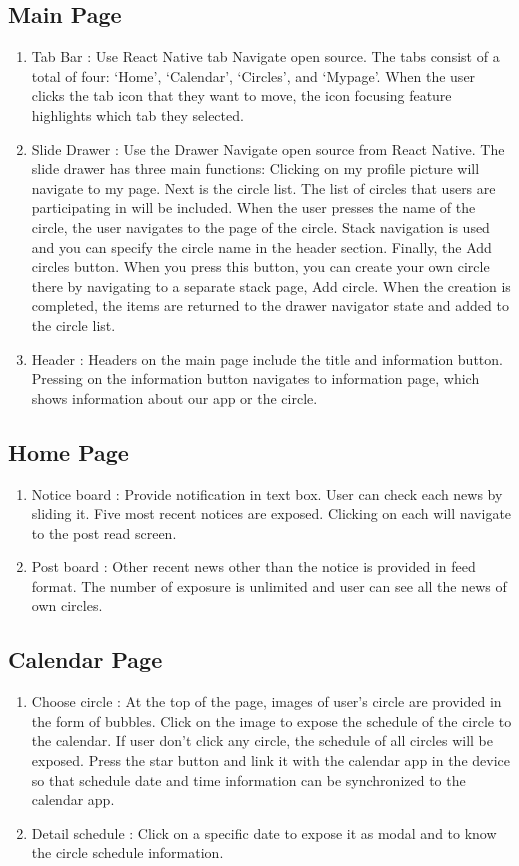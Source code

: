 \documentclass[conference]{IEEEtran}
\begin{document}
\subsection{Main Page}
\begin{enumerate}
    \item Tab Bar : Use React Native tab Navigate open source. The tabs consist of a total of four: `Home', `Calendar', `Circles', and `Mypage'. When the user clicks the tab icon that they want to move, the icon focusing feature highlights which tab they selected.
    \item Slide Drawer : Use the Drawer Navigate open source from React Native. The slide drawer has three main functions: Clicking on my profile picture will navigate to my page. Next is the circle list. The list of circles that users are participating in will be included. When the user presses the name of the circle, the user navigates to the page of the circle. Stack navigation is used and you can specify the circle name in the header section. Finally, the Add circles button. When you press this button, you can create your own circle there by navigating to a separate stack page, Add circle. When the creation is completed, the items are returned to the drawer navigator state and added to the circle list.
    \item Header : Headers on the main page include the title and information button. Pressing on the information button navigates to information page, which shows information about our app or the circle.
\end{enumerate}
\subsection{Home Page}
\begin{enumerate}
    \item Notice board : Provide notification in text box. User can check each news by sliding it. Five most recent notices are exposed. Clicking on each will navigate to the post read screen.
    \item Post board : Other recent news other than the notice is provided in feed format. The number of exposure is unlimited and user can see all the news of own circles.
\end{enumerate}
\subsection{Calendar Page}
\begin{enumerate}
    \item Choose circle : At the top of the page, images of user's circle are provided in the form of bubbles. Click on the image to expose the schedule of the circle to the calendar. If user don't click any circle, the schedule of all circles will be exposed. Press the star button and link it with the calendar app in the device so that schedule date and time information can be synchronized to the calendar app.
    \item Detail schedule : Click on a specific date to expose it as modal and to know the circle schedule information.
\end{enumerate}
\end{document}
